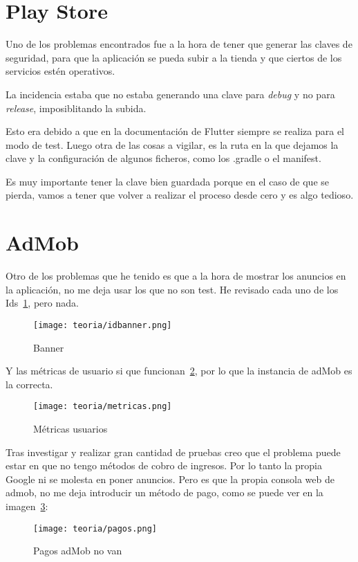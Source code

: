 \section{Play Store}
Uno de los problemas encontrados fue a la hora de tener que generar las claves de seguridad, para que la aplicación se pueda subir a la tienda y que ciertos de los servicios estén operativos.

La incidencia estaba que no estaba generando una clave para \emph{debug} y no para \emph{release}, imposiblitando la subida.

Esto era debido a que en la documentación de Flutter siempre se realiza para el modo de test. Luego otra de las cosas a vigilar, es la ruta en la que dejamos la clave y la configuración de algunos ficheros, como los .gradle o el manifest.

Es muy importante tener la clave bien guardada porque en el caso de que se pierda, vamos a tener que volver a realizar el proceso desde cero y es algo tedioso.

\section{AdMob}
Otro de los problemas que he tenido es que a la hora de mostrar los anuncios en la aplicación, no me deja usar los que no son test. He revisado cada uno de los Ids~\ref{fig:idbanner}, pero nada.

\begin{figure}[H]
	\centering
	\texttt{[image: teoria/idbanner.png]}
	\caption{Banner}\label{fig:idbanner}
\end{figure}

Y las métricas de usuario si que funcionan~\ref{fig:metricas}, por lo que la instancia de adMob es la correcta.

\begin{figure}[H]
	\centering
	\texttt{[image: teoria/metricas.png]}
	\caption{Métricas usuarios}\label{fig:metricas}
\end{figure}

Tras investigar y realizar gran cantidad de pruebas creo que el problema puede estar en que no tengo métodos de cobro de ingresos. Por lo tanto la propia Google ni se molesta en poner anuncios. Pero es que la propia consola web de admob, no me deja introducir un método de pago, como se puede ver en la imagen~\ref{fig:pagos}:

\begin{figure}[H]
	\centering
	\texttt{[image: teoria/pagos.png]}
	\caption{Pagos adMob no van}\label{fig:pagos}
\end{figure}



